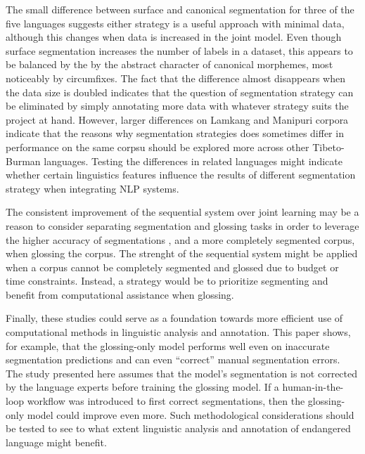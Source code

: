 The small difference between surface and canonical segmentation for three of the five languages suggests either strategy is a useful approach with minimal data, although this changes when data is increased in the joint model. Even though surface segmentation increases the number of labels in a dataset, this appears to be balanced by the by the abstract character of canonical morphemes, most noticeably by circumfixes. The fact that the difference almost disappears when the data size is doubled indicates that the question of segmentation strategy can be eliminated by simply annotating more data with whatever strategy suits the project at hand. 
However, larger differences on Lamkang and Manipuri corpora indicate that the reasons why segmentation strategies does sometimes differ in performance on the same corpsu should be explored more across other Tibeto-Burman languages. Testing the differences in related languages might indicate whether certain linguistics features influence the results of different segmentation strategy when integrating NLP systems. 

The consistent improvement of the sequential system over joint learning may be a reason to consider separating segmentation and glossing tasks in order to leverage the higher accuracy of segmentations , and a more completely segmented corpus, when glossing the corpus. 
The strenght of the sequential system might be applied when a corpus cannot be completely segmented and glossed due to budget or time constraints. Instead, a strategy would be to prioritize segmenting and benefit from computational assistance when glossing. 

Finally, these studies could serve as a foundation towards more efficient use of computational methods in linguistic analysis and annotation. This paper shows, for example, that the glossing-only model performs well even on inaccurate segmentation predictions and can even ``correct'' manual segmentation errors. The study presented here assumes that the model's segmentation is not corrected by the language experts before training the glossing model. If a human-in-the-loop workflow was introduced to first correct segmentations, then the glossing-only model could improve even more. Such methodological considerations should be tested to see to what extent linguistic analysis and annotation of endangered language might benefit.

